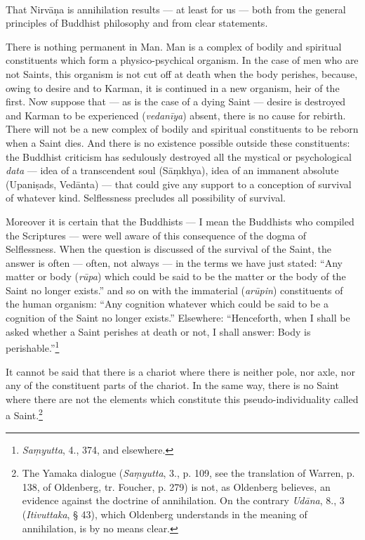 \documentclass[a4paper, 11pt, oneside, english]{article}
\begin{document}
\paragraph{}
That Nirvāṇa is annihilation results --- at least for us --- both from the general principles of Buddhist philosophy and from clear statements.

There is nothing permanent in Man. Man is a complex of bodily and spiritual constituents which form a physico-psychical organism. In the case of men who are not Saints, this organism is not cut off at death when the body perishes, because, owing to desire and to Karman, it is continued in a new organism, heir of the first. Now suppose that --- as is the case of a dying Saint --- desire is destroyed and Karman to be experienced (\emph{vedanīya}) absent, there is no cause for rebirth. There will not be a new complex of bodily and spiritual constituents to be reborn when a Saint dies. And there is no existence possible outside these constituents: the Buddhist criticism has sedulously destroyed all the mystical or psychological \emph{data} --- idea of a transcendent soul (Sāṃkhya), idea of an immanent absolute (Upaniṣads, Vedānta) --- that could give any support to a conception of survival of whatever kind. Selflessness precludes all possibility of survival.

Moreover it is certain that the Buddhists --- I mean the Buddhists who compiled the Scriptures --- were well aware of this consequence of the dogma of Selflessness. When the question is discussed of the survival of the Saint, the answer is often --- often, not always --- in the terms we have just stated: ``Any matter or body (\emph{rūpa}) which could be said to be the matter or the body of the Saint no longer exists.'' and so on with the immaterial (\emph{arūpin}) constituents of the human organism: ``Any cognition whatever which could be said to be a cognition of the Saint no longer exists.'' Elsewhere: ``Henceforth, when I shall be asked whether a Saint perishes at death or not, I shall answer: Body is perishable.''\footnote{\emph{Saṃyutta}, 4., 374, and elsewhere.}

It cannot be said that there is a chariot where there is neither pole, nor axle, nor any of the constituent parts of the chariot. In the same way, there is no Saint where there are not the elements which constitute this pseudo-individuality called a Saint.\footnote{The Yamaka dialogue (\emph{Saṃyutta}, 3., p. 109, see the translation of Warren, p. 138, of Oldenberg, tr. Foucher, p. 279) is not, as Oldenberg believes, an evidence against the doctrine of annihilation. On the contrary \emph{Udāna}, 8., 3 (\emph{Itivuttaka}, § 43), which Oldenberg understands in the meaning of annihilation, is by no means clear.}
\end{document}
